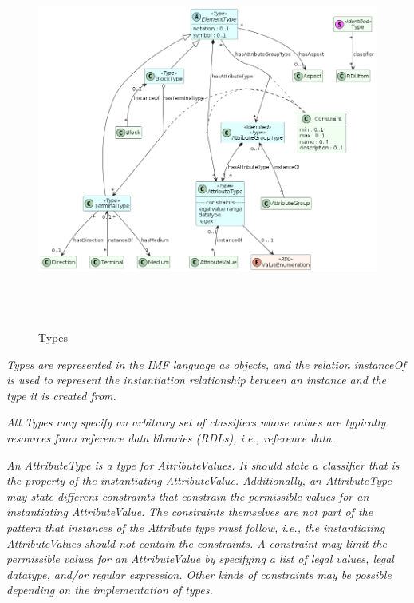 \begin{figure}[htb]
  \centering
  \includegraphics[width=6.2285in,height=4.87899in]{img/IMFmanual-img048.png}
  \caption{Types}
  \label{fig:Figure 29}
\end{figure}

{\itshape
Types are represented in the IMF language as objects, and the relation instanceOf is used to represent the
instantiation relationship between an instance and the type it is created from.}

\textit{All Types }\textit{may specify an arbitrary set of classifiers whose values are typically resources from reference data
  libraries (RDLs), i.e., reference data.}

\textit{An AttributeType is a type for AttributeValues. It should state a classifier that is the property of the
  instantiating AttributeValue. Additionally, an AttributeType may state different constraints that constrain the
  permissible values for an instantiating AttributeValue. }\textit{The constraints themselves are not part of the pattern that instances of the Attribute type must follow,
  i.e., the instantiating AttributeValues should not contain the constraints. A constraint may limit the permissible
  values for an AttributeValue by specifying a list of legal values, legal datatype, and/or regular expression. Other
  kinds of constraints may be possible depending on the implementation of types.}

